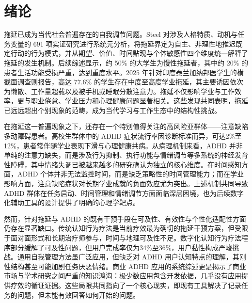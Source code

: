 \cleardoublepage

\section{绪论}

%

\par 拖延已成为当代社会普遍存在的自我调节问题。Steel 对涉及人格特质、动机与任务变量的 691 项实证研究进行系统元分析，将拖延界定为自主、非理性地推迟既定行动的行为模式，并从期望、价值、时间贴现与个体敏感性四个维度统一解释了拖延的发生机制\cite{steel2007nature}。后续综述显示，约 50\% 的大学生为慢性拖延者，其中约 20\% 的患者生活功能受损严重，达到重度水平\cite{klingsieck2013procrastination}。2025 年针对印度泰兰加纳邦医学生的横截面调查则报告，高达 77.6\% 的学生存在中度至高度学业拖延，其主要诱因依次为懒散、工作量超载以及被手机或睡眠分散注意力。拖延不仅影响学业与工作效率，更与职业倦怠、学业压力和心理健康问题显著相关。这些发现共同表明，拖延已远远超出个别现象的范畴，成为当代学习与工作生态中的结构性挑战。

\par 在拖延这一普遍现象之下，还存在一个特别值得关注的高风险亚群体——注意缺陷多动障碍患者。高校生群体中的 ADHD 症状流行率因诊断标准而异，可达2\%至12\%，患者常伴随学业表现下滑与心理健康共病\cite{nugent2014adhd}。从病理机制来看，ADHD 并非单纯的注意力缺失，而是涉及行为抑制、执行功能与情绪调节等多系统的神经发育性障碍\cite{barkley1997behavioral,adler2017structure}，其中情绪失调已被越来越多的研究确认为独立的核心维度\cite{solergutierrez2023emotion}。在时间感知方面，ADHD 个体并非无法监控时间，而是缺乏策略性的时间管理能力\cite{seesjarvi2025time}；而在学业影响方面，注意缺陷症状对长期学业成就的负面效应尤为突出\cite{henning2022adhd}。上述机制共同导致 ADHD 群体在任务启动、时间管理和情绪调节方面面临深层困境，也为后续数字化辅助工具的设计提供了明确的心理学靶点。

\par 然而，针对拖延与 ADHD 的既有干预手段在可及性、有效性与个性化适配性方面仍存在显著缺口。传统认知行为疗法是当前疗效最为确切的拖延干预方案，但受限于面对面形式和长期治疗师参与，时间与地理可及性不足。数字化认知行为疗法程序部分缓解了可及性问题，但用户完成率仅为34\%至36\%，用户黏性构成严峻挑战\cite{mutter2023studicare}。通用自我管理方法虽广泛应用，但缺乏对 ADHD 用户认知特点的理解，其刚性结构甚至可能加剧任务厌恶情绪。商业 ADHD 应用的系统综述更是揭示了商业市场与学术研究之间严重的知识鸿沟：极少数应用包含开发依据，几乎没有应用提供疗效的循证证据\cite{pasarelu2020attention}。这些局限共同指向了一个核心现实，即现有工具解决了记录任务的问题，但未能有效回答如何开始的问题。

